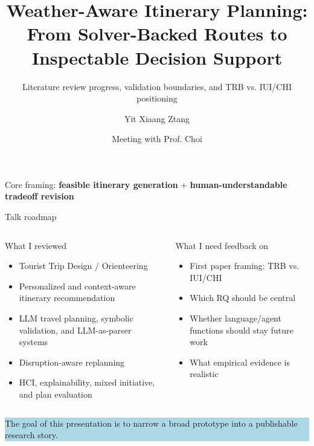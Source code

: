 \documentclass[aspectratio=169,10pt]{beamer}
\title{Weather-Aware Itinerary Planning:\\From Solver-Backed Routes to Inspectable Decision Support}
\subtitle{Literature review progress, validation boundaries, and TRB vs. IUI/CHI positioning}
\author{Yit Xiaang Ztang}
\date{Meeting with Prof. Choi}
\newcommand{\key}[1]{\textcolor{MutedBlue}{\textbf{#1}}}
\begin{document}
\begin{frame}
  \titlepage
  \vspace{-0.4em}
  \begin{center}
  \small Core framing: \key{feasible itinerary generation} + \key{human-understandable tradeoff revision}
  \end{center}
\end{frame}

\begin{frame}{Talk roadmap}
\begin{columns}[T,onlytextwidth]
\begin{block}{What I reviewed}
\begin{itemize}
  \item Tourist Trip Design / Orienteering
  \item Personalized and context-aware itinerary recommendation
  \item LLM travel planning, symbolic validation, and LLM-as-parser systems
  \item Disruption-aware replanning
  \item HCI, explainability, mixed initiative, and plan evaluation
\end{itemize}
\end{block}

\begin{block}{What I need feedback on}
\begin{itemize}
  \item First paper framing: TRB vs. IUI/CHI
  \item Which RQ should be central
  \item Whether language/agent functions should stay future work
  \item What empirical evidence is realistic
\end{itemize}
\end{block}
\end{columns}

\vspace{0.6em}
\centering
\colorbox{LightBlue}{\parbox{0.88\textwidth}{\centering\small The goal of this presentation is to narrow a broad prototype into a publishable research story.}}
\end{frame}
\end{document}
